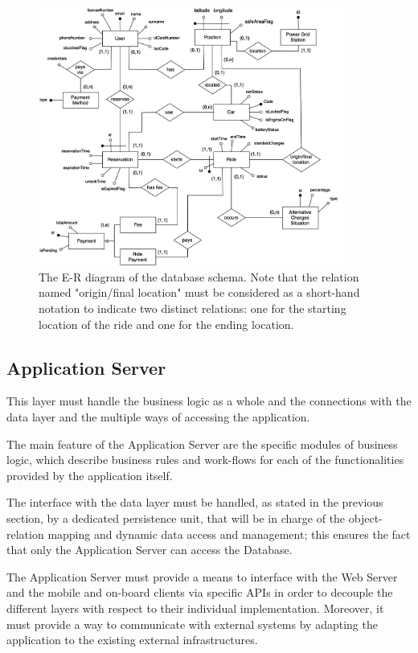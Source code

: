 \begin{figure}[H]
\begin{center}
		\includegraphics[width=0.9\textwidth]{./arch_design/diagrams/er_dg.png}
		\caption{The E-R diagram of the database schema. Note that the relation named "origin/final location" must be considered as a short-hand notation to indicate two distinct relations: one for the starting location of the ride and one for the ending location.}
		\label{er_dg}
\end{center}
\end{figure}

\subsection{Application Server}
This layer must handle the business logic as a whole and the connections with the data layer and the multiple ways of accessing the application.

The main feature of the Application Server are the specific modules of business logic, which describe business rules and work-flows for each of the functionalities provided by the application itself.

The interface with the data layer must be handled, as stated in the previous section, by a dedicated persistence unit, that will be in charge of the object-relation mapping and dynamic data access and management; this ensures the fact that only the Application Server can access the Database.

The Application Server must provide a means to interface with the Web Server and the mobile and on-board clients via specific APIs in order to decouple the different layers with respect to their individual implementation. Moreover, it must provide a way to communicate with external systems by adapting the application to the existing external infrastructures.


